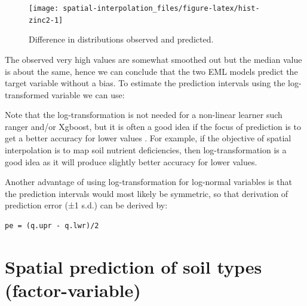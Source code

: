\documentclass[
  graybox,natbib,nospthms]{svmono}
\newenvironment{Shaded}{\begin{snugshade}}{\end{snugshade}}
\newcommand{\CommentTok}[1]{\textcolor[rgb]{0.37,0.37,0.37}{\textit{#1}}}
\newcommand{\DecValTok}[1]{\textcolor[rgb]{0.06,0.06,0.06}{#1}}
\newcommand{\FunctionTok}[1]{\textcolor[rgb]{0,0,0}{#1}}
\newcommand{\NormalTok}[1]{#1}
\newcommand{\OtherTok}[1]{\textcolor[rgb]{0.37,0.37,0.37}{#1}}
\newcommand{\SpecialCharTok}[1]{\textcolor[rgb]{0,0,0}{#1}}
\begin{document}
\begin{figure}

{\centering \texttt{[image: spatial-interpolation\_files/figure-latex/hist-zinc2-1]} 

}

\caption{Difference in distributions observed and predicted.}\label{fig:hist-zinc2}
\end{figure}

The observed very high values are somewhat smoothed out but the median value is
about the same, hence we can conclude that the two EML models predict the target
variable without a bias. To estimate the prediction intervals using the log-transformed
variable we can use:

\begin{Shaded}
\end{Shaded}

Note that the log-transformation is not needed for a non-linear learner such
ranger and/or Xgboost, but it is often a good idea if the focus of prediction is
to get a better accuracy for lower values \citep{hengl2021african}. For example, if the objective of spatial
interpolation is to map soil nutrient deficiencies, then log-transformation is a
good idea as it will produce slightly better accuracy for lower values.

Another advantage of using log-transformation for log-normal variables is that
the prediction intervals would most likely be symmetric, so that derivation of
prediction error (±1 s.d.) can be derived by:

\begin{verbatim}
pe = (q.upr - q.lwr)/2
\end{verbatim}

\hypertarget{spatial-prediction-of-soil-types-factor-variable}{%
\section{Spatial prediction of soil types (factor-variable)}\label{spatial-prediction-of-soil-types-factor-variable}}
\end{document}
